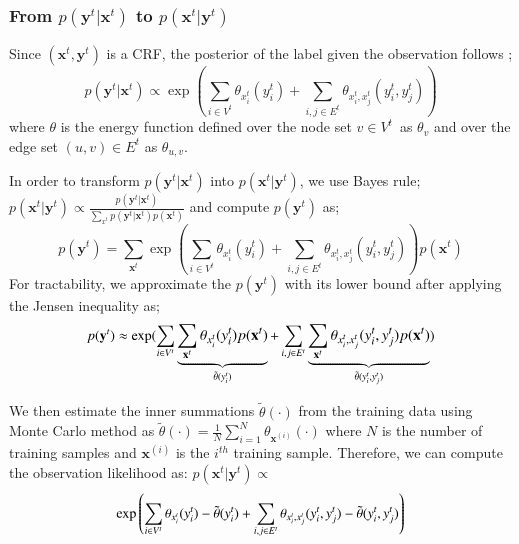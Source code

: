 \subsubsection{From $p(\mathbf{y}^t|\mathbf{x}^t)$ to $p(\mathbf{x}^t|\mathbf{y}^t)$}
Since $(\mathbf{x}^t,\mathbf{y}^t)$ is a CRF, the posterior of the label given the observation follows \cite{geman}; %
\begin{equation}
p(\mathbf{y}^t|\mathbf{x}^t) \propto \exp\left( \sum_{i \in V^t} \theta_{x^t_i}(y^t_i) + \sum_{i,j \in E^t} \theta_{x^t_i,x^t_j}(y^t_i,y^t_j)  \right)
\label{crflogl}
\end{equation}
where $\theta$ is the energy function defined over the node set \mbox{$v \in V^t$ }as $\theta_{v}$ and over the edge set \mbox{$(u,v) \in E^t$} as $\theta_{u,v}$.

In order to transform  $p(\mathbf{y}^t|\mathbf{x}^t)$ into  $p(\mathbf{x}^t|\mathbf{y}^t)$, we use Bayes rule;
$p(\mathbf{x}^t|\mathbf{y}^t) \propto  \frac{p(\mathbf{y}^t|\mathbf{x}^t)}{ \sum_{x^t} p(\mathbf{y}^t|\mathbf{x}^t)p(\mathbf{x}^t)}$ and compute $p(\mathbf{y}^t)$ as; %
\begin{equation}
p(\mathbf{y}^t)=\sum_{\mathbf{x}^t} \exp\left( \sum_{i \in V^t} \theta_{x^t_i}(y^t_i) + \sum_{i,j \in E^t} \theta_{x^t_i,x^t_j}(y^t_i,y^t_j) \right) p(\mathbf{x}^t)
\end{equation}
For tractability, we approximate the $p(\mathbf{y}^t)$ with its lower bound after applying the Jensen inequality as;
\begin{equation}
	\small
p(\mathbf{y}^t) \approx \exp ( \sum_{i \in V^t} \underbrace{\sum_{\mathbf{x}^t} \theta_{x^t_i}(y^t_i)  p(\mathbf{x}^t)}_{\tilde{\theta}(y^t_i)} + \sum_{i,j \in E^t} \underbrace{ \sum_{\mathbf{x}^t}  \theta_{x^t_i,x^t_j}(y^t_i,y^t_j) p(\mathbf{x}^t)}_{\tilde{\theta}(y^t_i,y^t_j)} )
\end{equation}

We then estimate the inner summations $\tilde{\theta}(\cdot)$
from the training data
using Monte Carlo method
 as \mbox{$\tilde{\theta}(\cdot) = \frac{1}{N}\sum_{i=1}^N \theta_{\mathbf{x}^{(i)}}(\cdot)$} where $N$ is the number of training samples and $\mathbf{x}^{(i)}$ is the $i^{th}$ training sample.
 Therefore, we can compute the observation likelihood as:  $p(\mathbf{x}^t|\mathbf{y}^t) \propto$
\begin{equation}\small
\exp\left( \sum_{i \in V^t} \theta_{x^t_i}(y^t_i) - \tilde{\theta}(y^t_i) + \sum_{i,j \in E^t} \theta_{x^t_i,x^t_j}(y^t_i,y^t_j) - \tilde{\theta}(y^t_i,y^t_j)  \right)
\label{obsprob}
\end{equation}

